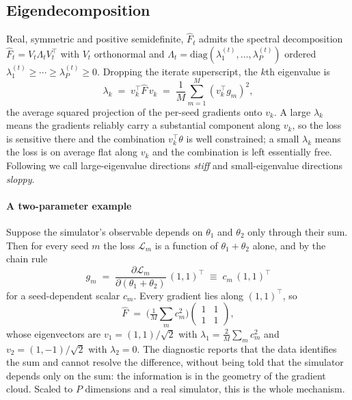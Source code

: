 \documentclass[10pt,twocolumn]{article}
\newcommand{\Fhat}{\hat{F}}
\newcommand{\Ltot}{\mathcal{L}}
\begin{document}
\subsection{Eigendecomposition}
\label{sec:method:eigen}

Real, symmetric and positive semidefinite, $\Fhat_t$ admits the spectral
decomposition $\Fhat_t = V_t \Lambda_t V_t^\top$ with $V_t$ orthonormal and
$\Lambda_t = \mathrm{diag}(\lambda_1^{(t)}, \dots, \lambda_P^{(t)})$ ordered
$\lambda_1^{(t)} \ge \cdots \ge \lambda_P^{(t)} \ge 0$. Dropping the iterate
superscript, the $k$th eigenvalue is
\begin{equation}
  \lambda_k \;=\; v_k^\top \Fhat\, v_k
             \;=\; \frac{1}{M}\sum_{m=1}^M (v_k^\top g_m)^2 ,
\end{equation}
the average squared projection of the per-seed gradients onto $v_k$. A large
$\lambda_k$ means the gradients reliably carry a substantial component along $v_k$,
so the loss is sensitive there and the combination $v_k^\top\theta$ is well
constrained; a small $\lambda_k$ means the loss is on average flat along $v_k$ and
the combination is left essentially free. Following \citet{gutenkunst2007universally}
we call large-eigenvalue directions \emph{stiff} and small-eigenvalue directions
\emph{sloppy}.

\paragraph{A two-parameter example}
Suppose the simulator's observable depends on $\theta_1$ and $\theta_2$ only through
their sum. Then for every seed $m$ the loss $\Ltot_m$ is a function of
$\theta_1+\theta_2$ alone, and by the chain rule
\begin{equation}
  g_m \;=\; \frac{\partial \Ltot_m}{\partial(\theta_1+\theta_2)}\,(1,1)^\top
      \;\equiv\; c_m\,(1,1)^\top
\end{equation}
for a seed-dependent scalar $c_m$. Every gradient lies along $(1,1)^\top$, so
\begin{equation}
  \Fhat \;=\; \Big(\tfrac{1}{M}\textstyle\sum_m c_m^2\Big)
              \begin{pmatrix} 1 & 1 \\ 1 & 1 \end{pmatrix},
\end{equation}
whose eigenvectors are $v_1 = (1,1)/\sqrt2$ with $\lambda_1 = \tfrac{2}{M}\sum_m
c_m^2$ and $v_2 = (1,-1)/\sqrt2$ with $\lambda_2 = 0$. The diagnostic reports that
the data identifies the sum and cannot resolve the difference, without being told
that the simulator depends only on the sum: the information is in the geometry of
the gradient cloud. Scaled to $P$ dimensions and a real simulator, this is the whole
mechanism.
\end{document}
